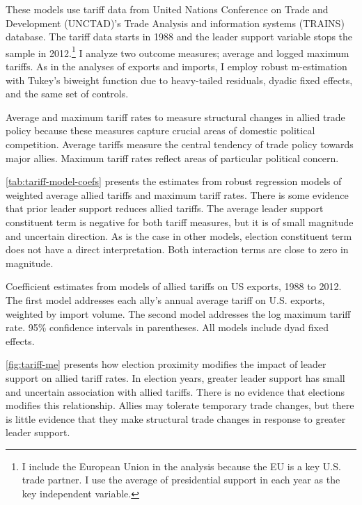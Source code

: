 \documentclass[12pt]{article}
\begin{document}
These models use tariff data from United Nations Conference on Trade and Development (UNCTAD)'s Trade Analysis and information systems (TRAINS) database. 
The tariff data starts in 1988 and the leader support variable stops the sample in 2012.\footnote{I include the European Union in the analysis because the EU is a key U.S. trade partner. I use the average of presidential support in each year as the key independent variable.}
I analyze two outcome measures; average and logged maximum tariffs. 
As in the analyses of exports and imports, I employ robust m-estimation with Tukey's biweight function due to heavy-tailed residuals, dyadic fixed effects, and the same set of controls.


Average and maximum tariff rates to measure structural changes in allied trade policy because these measures capture crucial areas of domestic political competition.
Average tariffs measure the central tendency of trade policy towards major allies. 
Maximum tariff rates reflect areas of particular political concern.


\autoref{tab:tariff-model-coefs} presents the estimates from robust regression models of weighted average allied tariffs and maximum tariff rates. 
There is some evidence that prior leader support reduces allied tariffs. 
The average leader support constituent term is negative for both tariff measures, but it is of small magnitude and uncertain direction.
As is the case in other models, election constituent term does not have a direct interpretation.
Both interaction terms are close to zero in magnitude. 


\begin{table}
\centering

	\caption{Coefficient estimates from models of allied tariffs on US exports, 1988 to 2012. The first model addresses each ally's annual average tariff on U.S. exports, weighted by import volume. The second model addresses the log maximum tariff rate. 95\% confidence intervals in parentheses. All models include dyad fixed effects.}
	\label{tab:tariff-model-coefs}
\end{table}


\autoref{fig:tariff-me} presents how election proximity modifies the impact of leader support on allied tariff rates.
In election years, greater leader support has small and uncertain association with allied tariffs. 
There is no evidence that elections modifies this relationship.
Allies may tolerate temporary trade changes, but there is little evidence that they make structural trade changes in response to greater leader support.
\end{document}
